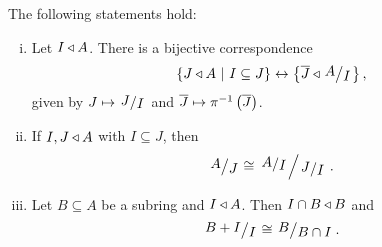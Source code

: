 \begin{izrek}
The following statements hold:

\begin{enumerate}[i)]
\item Let $I \triangleleft A$. There is a bijective correspondence
\[
\setb{J \edn A}{I \subseteq J} \leftrightarrow
\set{\oline{J} \edn \kvoc{A}{I}},
\]
given by $J \mapsto \kvoc{J}{I}$ and
$\overline{J} \mapsto \pi^{-1} \left(\overline{J}\right)$.
\item If $I, J \triangleleft A$ with $I \subseteq J$, then
\[
\kvoc{A}{J} \cong \kvoc{\kvoc{A}{I}}{\kvoc{J}{I}}.
\]
\item Let $B \subseteq A$ be a subring and $I \triangleleft A$. Then
$I \cap B \triangleleft B$ and
\[
\kvoc{B+I}{I} \cong \kvoc{B}{B \cap I}.
\]
\end{enumerate}
\end{izrek}
